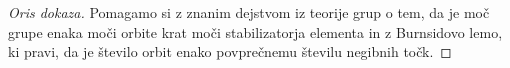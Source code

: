 \documentclass[11pt,a4paper]{article}
\theoremstyle{definition} %
\theoremstyle{plain} %
\begin{document}
\begin{proof}[Oris dokaza]
    Pomagamo si z znanim dejstvom iz teorije grup o tem, da je moč grupe enaka moči orbite krat moči stabilizatorja elementa in z Burnsidovo lemo, ki pravi, da je število orbit enako povprečnemu številu negibnih točk.
\end{proof}

%
%
%
%
\end{document}
